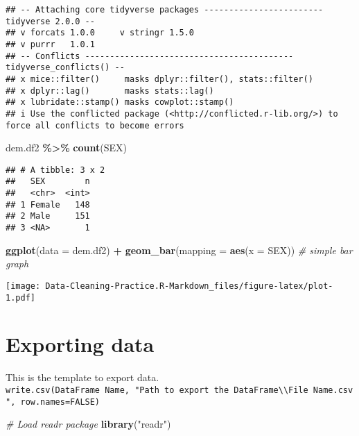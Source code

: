 \documentclass[
]{article}
\newenvironment{Shaded}{\begin{snugshade}}{\end{snugshade}}
\newcommand{\AttributeTok}[1]{\textcolor[rgb]{0.13,0.29,0.53}{#1}}
\newcommand{\CommentTok}[1]{\textcolor[rgb]{0.56,0.35,0.01}{\textit{#1}}}
\newcommand{\FunctionTok}[1]{\textcolor[rgb]{0.13,0.29,0.53}{\textbf{#1}}}
\newcommand{\NormalTok}[1]{#1}
\newcommand{\SpecialCharTok}[1]{\textcolor[rgb]{0.81,0.36,0.00}{\textbf{#1}}}
\newcommand{\StringTok}[1]{\textcolor[rgb]{0.31,0.60,0.02}{#1}}
\begin{document}
\begin{verbatim}
## -- Attaching core tidyverse packages ------------------------ tidyverse 2.0.0 --
## v forcats 1.0.0     v stringr 1.5.0
## v purrr   1.0.1     
## -- Conflicts ------------------------------------------ tidyverse_conflicts() --
## x mice::filter()     masks dplyr::filter(), stats::filter()
## x dplyr::lag()       masks stats::lag()
## x lubridate::stamp() masks cowplot::stamp()
## i Use the conflicted package (<http://conflicted.r-lib.org/>) to force all conflicts to become errors
\end{verbatim}

\begin{Shaded}
\begin{Highlighting}[]
\NormalTok{dem.df2 }\SpecialCharTok{\%\textgreater{}\%} \FunctionTok{count}\NormalTok{(SEX) }
\end{Highlighting}
\end{Shaded}

\begin{verbatim}
## # A tibble: 3 x 2
##   SEX        n
##   <chr>  <int>
## 1 Female   148
## 2 Male     151
## 3 <NA>       1
\end{verbatim}

\begin{Shaded}
\begin{Highlighting}[]
\FunctionTok{ggplot}\NormalTok{(}\AttributeTok{data =}\NormalTok{ dem.df2) }\SpecialCharTok{+} 
  \FunctionTok{geom\_bar}\NormalTok{(}\AttributeTok{mapping =} \FunctionTok{aes}\NormalTok{(}\AttributeTok{x =}\NormalTok{ SEX)) }\CommentTok{\# simple bar graph}
\end{Highlighting}
\end{Shaded}

\texttt{[image: Data-Cleaning-Practice.R-Markdown\_files/figure-latex/plot-1.pdf]}

\hypertarget{exporting-data}{%
\section{Exporting data}\label{exporting-data}}

This is the template to export data.
\texttt{write.csv(DataFrame\ Name,\ "Path\ to\ export\ the\ DataFrame\textbackslash{}\textbackslash{}File\ Name.csv",\ row.names=FALSE)}

\begin{Shaded}
\begin{Highlighting}[]
\CommentTok{\# Load readr package}
\FunctionTok{library}\NormalTok{(}\StringTok{"readr"}\NormalTok{)}
\end{Highlighting}
\end{Shaded}
\end{document}
